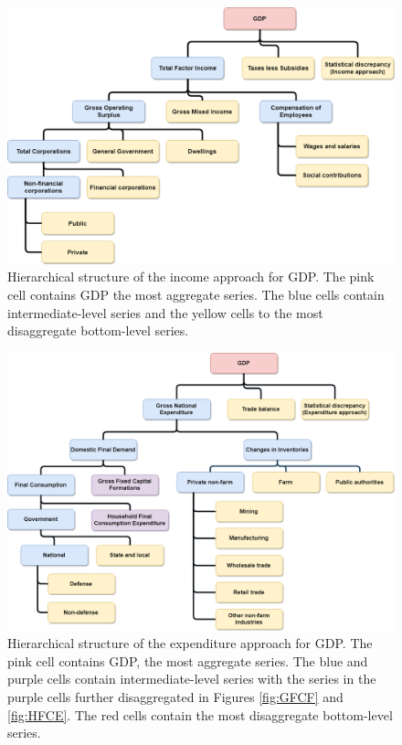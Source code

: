\documentclass[graybox]{svmult}
\begin{document}
\begin{figure}[H]
	\centering
	\includegraphics[width=\textwidth]{Figs/IncomeApproach.png}
	\caption{Hierarchical structure of the income approach for GDP. The pink cell contains GDP the most aggregate series. The blue cells contain intermediate-level series and the yellow cells to the most disaggregate bottom-level series.}\label{fig:GDP_I}
\end{figure}

\begin{figure}[H]
	\centering	\includegraphics[width=\textwidth]{Figs/ExpenditureApproach.png}
	\caption{Hierarchical structure of the expenditure approach for GDP. The pink cell contains GDP, the most aggregate series. The blue and purple cells contain intermediate-level series with the series in the purple cells further disaggregated in Figures \ref{fig:GFCF} and \ref{fig:HFCE}. The red cells contain the most disaggregate bottom-level series.}\label{fig:GDP_E}
\end{figure}
\end{document}
